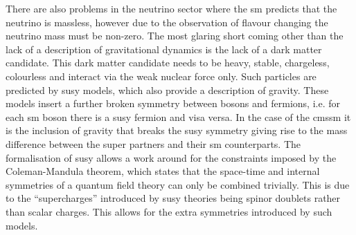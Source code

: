 There are also problems in the neutrino sector where the \ac{sm} predicts that 
the neutrino is massless, however due to the observation of flavour changing 
the neutrino mass must be non-zero.
The most glaring short coming other than the lack of a description of 
gravitational dynamics is the lack of a dark matter candidate. This dark matter 
candidate needs to be heavy, stable, chargeless, colourless and interact via 
the weak nuclear force only. Such particles are predicted by 
\ac{susy}\cite{ref:SUSY-1, ref:SUSY0, ref:SUSY1, ref:SUSY2, ref:SUSY3, 
ref:SUSY4, ref:hierarchy1, ref:hierarchy2} 
models, which also provide a description of gravity. These models insert a 
further broken symmetry between bosons and fermions, i.e. for each \ac{sm} 
boson there is a \ac{susy} fermion and visa versa. In the case of the 
\ac{cmssm} it is the inclusion of gravity that breaks the \ac{susy} symmetry 
giving rise to the mass difference between the super partners and their \ac{sm} 
counterparts. 
The formalisation of \ac{susy} allows a work around for the constraints imposed 
by the Coleman-Mandula\cite{coleman-mandula} theorem, which states that the 
space-time and internal symmetries of a quantum field theory can only be 
combined trivially. This is due to the ``supercharges'' introduced by \ac{susy}
theories being spinor doublets rather than scalar charges. This allows for the 
extra symmetries introduced by such models.


